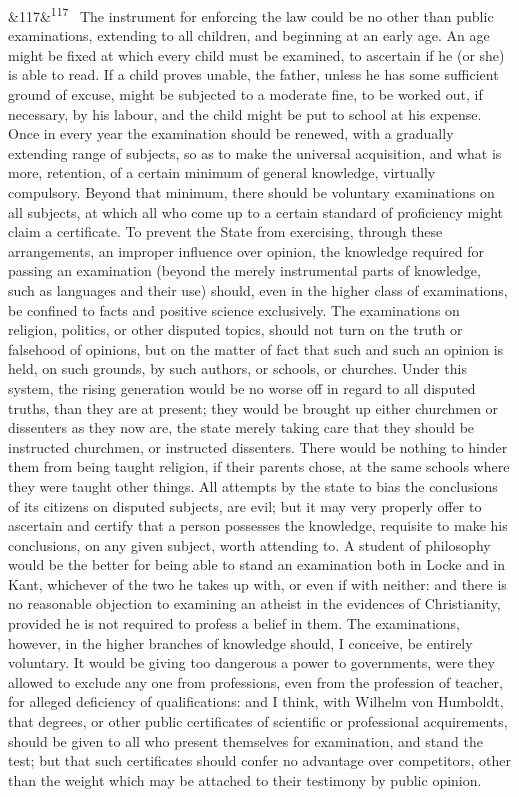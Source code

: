 \documentclass[12pt]{article}
\newcommand{\para}[1][]{\par\noindent\ifx&#1&\else\textsuperscript{\footnotesize #1}~\fi}
\begin{document}
\para[117] The instrument for enforcing the law could be no other than public examinations, extending to all children, and beginning at an early age. An age might be fixed at which every child must be examined, to ascertain if he (or she) is able to read. If a child proves unable, the father, unless he has some sufficient ground of excuse, might be subjected to a moderate fine, to be worked out, if necessary, by his labour, and the child might be put to school at his expense. Once in every year the examination should be renewed, with a gradually extending range of subjects, so as to make the universal acquisition, and what is more, retention, of a certain minimum of general knowledge, virtually compulsory. Beyond that minimum, there should be voluntary examinations on all subjects, at which all who come up to a certain standard of proficiency might claim a certificate. To prevent the State from exercising, through these arrangements, an improper influence over opinion, the knowledge required for passing an examination (beyond the merely instrumental parts of knowledge, such as languages and their use) should, even in the higher class of examinations, be confined to facts and positive science exclusively. The examinations on religion, politics, or other disputed topics, should not turn on the truth or falsehood of opinions, but on the matter of fact that such and such an opinion is held, on such grounds, by such authors, or schools, or churches. Under this system, the rising generation would be no worse off in regard to all disputed truths, than they are at present; they would be brought up either churchmen or dissenters as they now are, the state merely taking care that they should be instructed churchmen, or instructed dissenters. There would be nothing to hinder them from being taught religion, if their parents chose, at the same schools where they were taught other things. All attempts by the state to bias the conclusions of its citizens on disputed subjects, are evil; but it may very properly offer to ascertain and certify that a person possesses the knowledge, requisite to make his conclusions, on any given subject, worth attending to. A student of philosophy would be the better for being able to stand an examination both in Locke and in Kant, whichever of the two he takes up with, or even if with neither: and there is no reasonable objection to examining an atheist in the evidences of Christianity, provided he is not required to profess a belief in them. The examinations, however, in the higher branches of knowledge should, I conceive, be entirely voluntary. It would be giving too dangerous a power to governments, were they allowed to exclude any one from professions, even from the profession of teacher, for alleged deficiency of qualifications: and I think, with Wilhelm von Humboldt, that degrees, or other public certificates of scientific or professional acquirements, should be given to all who present themselves for examination, and stand the test; but that such certificates should confer no advantage over competitors, other than the weight which may be attached to their testimony by public opinion.
\end{document}
